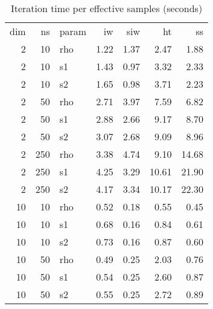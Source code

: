 \begin{table}[ht]
\centering
\caption{Iteration time per effective samples (seconds)} 
\label{time}
\begin{tabular}{rrlrrrr}
  \hline
dim & ns & param & iw & siw & ht & ss \\ 
   2 &  10 & rho & 1.22 & 1.37 & 2.47 & 1.88 \\ 
    2 &  10 & s1 & 1.43 & 0.97 & 3.32 & 2.33 \\ 
    2 &  10 & s2 & 1.65 & 0.98 & 3.71 & 2.23 \\ 
    2 &  50 & rho & 2.71 & 3.97 & 7.59 & 6.82 \\ 
    2 &  50 & s1 & 2.88 & 2.66 & 9.17 & 8.70 \\ 
    2 &  50 & s2 & 3.07 & 2.68 & 9.09 & 8.96 \\ 
    2 & 250 & rho & 3.38 & 4.74 & 9.10 & 14.68 \\ 
    2 & 250 & s1 & 4.25 & 3.29 & 10.61 & 21.90 \\ 
    2 & 250 & s2 & 4.17 & 3.34 & 10.17 & 22.30 \\ 
   \hline
\hline
 10 &  10 & rho & 0.52 & 0.18 & 0.55 & 0.45 \\ 
   10 &  10 & s1 & 0.68 & 0.16 & 0.84 & 0.61 \\ 
   10 &  10 & s2 & 0.73 & 0.16 & 0.87 & 0.60 \\ 
   10 &  50 & rho & 0.49 & 0.25 & 2.03 & 0.76 \\ 
   10 &  50 & s1 & 0.54 & 0.25 & 2.60 & 0.87 \\ 
   10 &  50 & s2 & 0.55 & 0.25 & 2.72 & 0.89 \\ 
   \hline
\end{tabular}
\end{table}
